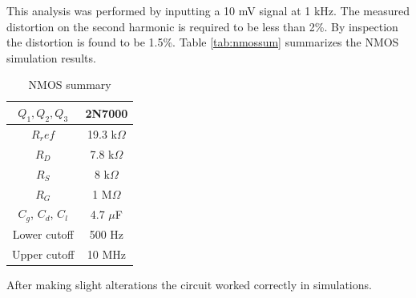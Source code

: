 	This analysis was performed by inputting a 10 mV signal at 1 kHz. The measured distortion on the second harmonic is required to be less than 2\%. By inspection the distortion is found to be 1.5\%. Table \ref{tab:nmossum} summarizes the NMOS simulation results.
	
	
	\begin{table}[H]
		\centering
		\caption{NMOS summary}
		\begin{tabular}{cc}
			$Q_1, Q_2, Q_3$ & 2N7000        \\ \hline
			$R_ref$         & 19.3 k$\Omega$ \\ \hline
			$R_D$           & 7.8 k$\Omega$  \\ \hline
			$R_S$           & 8 k$\Omega$   \\ \hline
			$R_G$           & 1 M$\Omega$  \\ \hline
			$C_g$, $C_d$, $C_l$ & 4.7 $\mu$F   \\ \hline
			Lower cutoff    &  500 Hz \\    \hline
			Upper cutoff    & 10 MHz \\    \hline
			
			     
		\end{tabular}
	\end{table}

After making slight alterations the circuit worked correctly in simulations.
	
	
	
	
	